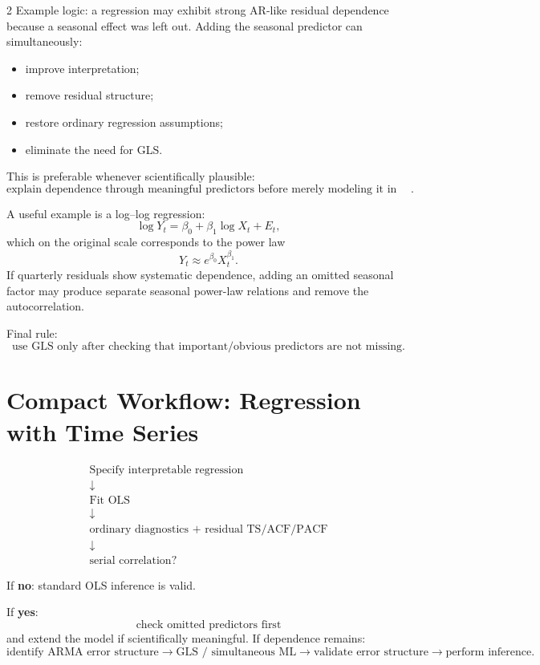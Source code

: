 \documentclass[9pt,a4paper]{extarticle}
\newcommand{\key}[1]{\textbf{#1}}
\begin{document}
\begin{multicols}{2}
Example logic: a regression may exhibit strong AR-like residual dependence because a seasonal effect was left out. Adding the seasonal predictor can simultaneously:
\begin{itemize}
\item improve interpretation;
\item remove residual structure;
\item restore ordinary regression assumptions;
\item eliminate the need for GLS.
\end{itemize}

This is preferable whenever scientifically plausible:
\[
\boxed{
\text{explain dependence through meaningful predictors before merely modeling it in errors}.
}
\]

A useful example is a log--log regression:
\[
\log Y_t=\beta_0+\beta_1\log X_t+E_t,
\]
which on the original scale corresponds to the power law
\[
\boxed{Y_t\approx e^{\beta_0}X_t^{\beta_1}.}
\]
If quarterly residuals show systematic dependence, adding an omitted seasonal factor may produce separate seasonal power-law relations and remove the autocorrelation.

Final rule:
\[
\boxed{
\text{use GLS only after checking that important/obvious predictors are not missing}.
}
\]

\section{Compact Workflow: Regression with Time Series}

\[
\boxed{
\begin{array}{c}
\text{Specify interpretable regression}\\
\downarrow\\
\text{Fit OLS}\\
\downarrow\\
\text{ordinary diagnostics + residual TS/ACF/PACF}\\
\downarrow\\
\text{serial correlation?}
\end{array}}
\]

If \key{no}: standard OLS inference is valid.

If \key{yes}:
\[
\boxed{
\text{check omitted predictors first}
}
\]
and extend the model if scientifically meaningful. If dependence remains:
\[
\boxed{
\text{identify ARMA error structure}
\rightarrow
\text{GLS / simultaneous ML}
\rightarrow
\text{validate error structure}
\rightarrow
\text{perform inference}.
}
\]


\end{multicols}
\end{document}
